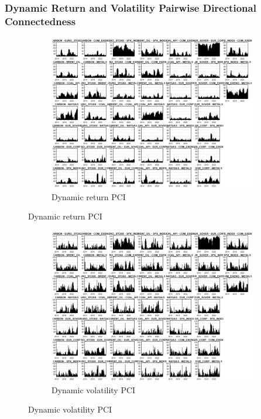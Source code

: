 \documentclass[preprint, 3p,
authoryear]{elsarticle} %
\begin{document}
\begin{landscape}
\newpage

\subsubsection{Dynamic Return and Volatility Pairwise Directional Connectedness}

\begin{figure}[!ht]
  \caption{Dynamic Return and Volatility Pairwise Connectedness Index (Jan 2013 – Jan 2025)}
  \centering
  \begin{subfigure}[a]{\textwidth}
    \caption{Dynamic return PCI}
    \includegraphics[width = 1.1\linewidth]{16aApdxD-8-180-RetPCI}
  \end{subfigure}
\end{figure}
\begin{figure}[!ht]
  \ContinuedFloat
  \centering
    \begin{subfigure}[b]{\textwidth}\ContinuedFloat
      \caption{Dynamic volatility PCI}
      \includegraphics[width = 1.2\linewidth]{16bApdxD-8-180-VolPCI}
    \end{subfigure}
\end{figure}










\end{landscape}
\end{document}
